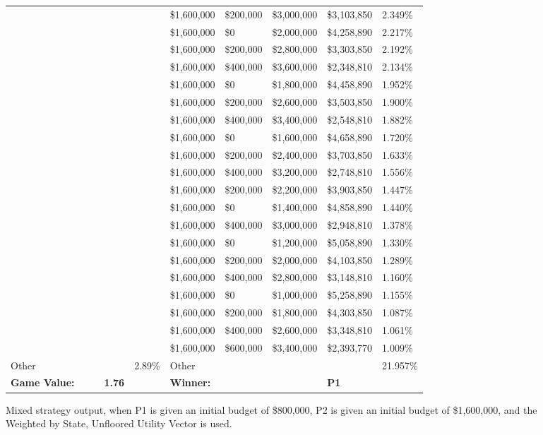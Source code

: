 \documentclass[11pt]{article}
\begin{document}
\begin{figure}
\begin{tabular}{ |p{1.0cm}p{1.0cm}p{1.0cm}p{2.0cm}|p{1.0cm}||p{1.0cm}p{1.0cm}p{1.0cm}p{2.0cm}|p{1.0cm}|}
&  &  &  &  & \$1,600,000 & \$200,000 & \$3,000,000 & \$3,103,850 & 2.349\% \\
&  &  &  &  & \$1,600,000 & \$0 & \$2,000,000 & \$4,258,890 & 2.217\% \\
&  &  &  &  & \$1,600,000 & \$200,000 & \$2,800,000 & \$3,303,850 & 2.192\% \\
&  &  &  &  & \$1,600,000 & \$400,000 & \$3,600,000 & \$2,348,810 & 2.134\% \\
&  &  &  &  & \$1,600,000 & \$0 & \$1,800,000 & \$4,458,890 & 1.952\% \\
&  &  &  &  & \$1,600,000 & \$200,000 & \$2,600,000 & \$3,503,850 & 1.900\% \\
&  &  &  &  & \$1,600,000 & \$400,000 & \$3,400,000 & \$2,548,810 & 1.882\% \\
&  &  &  &  & \$1,600,000 & \$0 & \$1,600,000 & \$4,658,890 & 1.720\% \\
&  &  &  &  & \$1,600,000 & \$200,000 & \$2,400,000 & \$3,703,850 & 1.633\% \\
&  &  &  &  & \$1,600,000 & \$400,000 & \$3,200,000 & \$2,748,810 & 1.556\% \\
&  &  &  &  & \$1,600,000 & \$200,000 & \$2,200,000 & \$3,903,850 & 1.447\% \\
&  &  &  &  & \$1,600,000 & \$0 & \$1,400,000 & \$4,858,890 & 1.440\% \\
&  &  &  &  & \$1,600,000 & \$400,000 & \$3,000,000 & \$2,948,810 & 1.378\% \\
&  &  &  &  & \$1,600,000 & \$0 & \$1,200,000 & \$5,058,890 & 1.330\% \\
&  &  &  &  & \$1,600,000 & \$200,000 & \$2,000,000 & \$4,103,850 & 1.289\% \\
&  &  &  &  & \$1,600,000 & \$400,000 & \$2,800,000 & \$3,148,810 & 1.160\% \\
&  &  &  &  & \$1,600,000 & \$0 & \$1,000,000 & \$5,258,890 & 1.155\% \\
&  &  &  &  & \$1,600,000 & \$200,000 & \$1,800,000 & \$4,303,850 & 1.087\% \\
&  &  &  &  & \$1,600,000 & \$400,000 & \$2,600,000 & \$3,348,810 & 1.061\% \\
&  &  &  &  & \$1,600,000 & \$600,000 & \$3,400,000 & \$2,393,770 & 1.009\% \\
\hline
Other &  &  &  & 2.89\% & Other &  &  &  & 21.957\% \\
\hline
\small \textbf{Game Value:} &&& \small \textbf{1.76} && \small \textbf{Winner:} &&& \small \textbf{P1}&\\
\hline
\end{tabular}
\caption{Mixed strategy output, when P1 is given an initial budget of \$800,000, P2 is given an initial budget of \$1,600,000, and the Weighted by State, Unfloored Utility Vector is used.}
\label{8v16table.5}
\end{figure}
\end{document}
